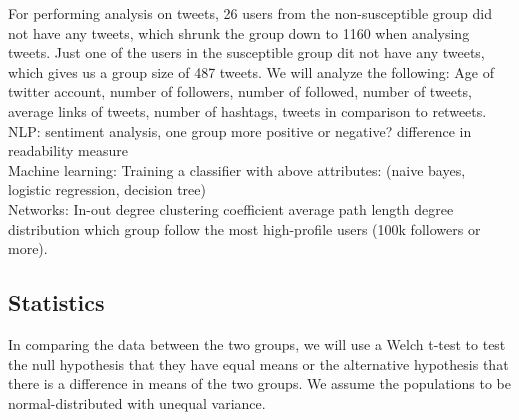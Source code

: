 \documentclass[10pt]{IEEEtran}
\begin{document}
For performing analysis on tweets, 26 users from the non-susceptible group did not have any tweets, which shrunk the group down to 1160 when analysing tweets. Just one of the users in the susceptible group dit not have any tweets, which gives us a group size of 487 tweets.
We will analyze the following: Age of twitter account, number of followers, number of followed, number of tweets, average links of tweets, number of hashtags, tweets in comparison to retweets.
\\
NLP:
sentiment analysis, one group more positive or negative?
difference in readability measure
\\
Machine learning:
Training a classifier with above attributes: (naive bayes, logistic regression, decision tree)
\\
Networks:
In-out degree
clustering coefficient
average path length
degree distribution
which group follow the most high-profile users (100k followers or more).

\subsection{Statistics}
In comparing the data between the two groups, we will use a Welch t-test to test the null hypothesis that they have equal means or the alternative hypothesis that there is a difference in means of the two groups. We assume the populations to be normal-distributed with unequal variance.
\end{document}
